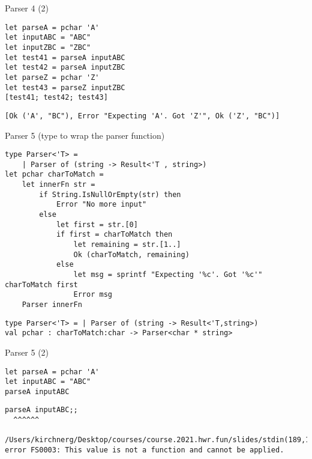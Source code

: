 \documentclass[t]{beamer}
\begin{document}
\begin{frame}[label={sec:org2603fa9},fragile]{Parser 4 (2)}
 \begin{verbatim}
let parseA = pchar 'A'
let inputABC = "ABC"
let inputZBC = "ZBC"
let test41 = parseA inputABC
let test42 = parseA inputZBC
let parseZ = pchar 'Z' 
let test43 = parseZ inputZBC
[test41; test42; test43]
\end{verbatim}

\begin{verbatim}
[Ok ('A', "BC"), Error "Expecting 'A'. Got 'Z'", Ok ('Z', "BC")]
\end{verbatim}
\end{frame}

\begin{frame}[label={sec:org2a20445},fragile]{Parser 5 (type to wrap the parser function)}
 \begin{verbatim}
type Parser<'T> =
    | Parser of (string -> Result<'T , string>)
let pchar charToMatch = 
    let innerFn str =
        if String.IsNullOrEmpty(str) then
            Error "No more input"
        else
            let first = str.[0] 
            if first = charToMatch then
                let remaining = str.[1..]
                Ok (charToMatch, remaining)
            else
                let msg = sprintf "Expecting '%c'. Got '%c'" charToMatch first
                Error msg
    Parser innerFn
\end{verbatim}

\begin{verbatim}
type Parser<'T> = | Parser of (string -> Result<'T,string>)
val pchar : charToMatch:char -> Parser<char * string>
\end{verbatim}
\end{frame}

\begin{frame}[label={sec:org94dfd27},fragile]{Parser 5 (2)}
 \begin{verbatim}
let parseA = pchar 'A'
let inputABC = "ABC"
parseA inputABC
\end{verbatim}

\begin{verbatim}
parseA inputABC;;
  ^^^^^^

/Users/kirchnerg/Desktop/courses/course.2021.hwr.fun/slides/stdin(189,1): error FS0003: This value is not a function and cannot be applied.
\end{verbatim}
\end{frame}
\end{document}
